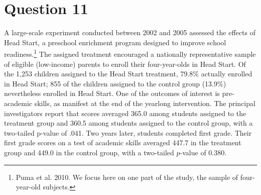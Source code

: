 \documentclass[11pt,notitlepage]{article}\usepackage[]{graphicx}\usepackage[]{color}
\begin{document}
\section*{Question 11}
A large-scale experiment conducted between 2002 and 2005 assessed the effects of Head Start, a preschool enrichment program designed to improve school readiness.\footnote{Puma et al. 2010. We focus here on one part of the study, the sample of four-year-old subjects.} The assigned treatment encouraged a nationally representative sample of eligible (low-income) parents to enroll their four-year-olds in Head Start. Of the 1,253 children assigned to the Head Start treatment, 79.8\% actually enrolled in Head Start; 855 of the children assigned to the control group (13.9\%) nevertheless enrolled in Head Start. One of the outcomes of interest is pre-academic skills, as manifest at the end of the yearlong intervention. The principal investigators report that scores averaged 365.0 among students assigned to the treatment group and 360.5 among students assigned to the control group, with a two-tailed p-value of .041. Two years later, students completed first grade. Their first grade scores on a test of academic skills averaged 447.7 in the treatment group and 449.0 in the control group, with a two-tailed $p$-value of 0.380.
\end{document}
